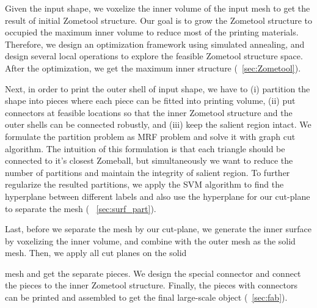 Given the input shape, we voxelize the inner volume of the input mesh to get the result of  initial Zometool structure.
Our goal is to grow the Zometool structure to occupied the maximum inner volume  to reduce most of the printing materials.
Therefore, we design an optimization framework using simulated annealing, and design several local operations to explore the feasible Zometool structure space.
After the optimization, we get the maximum inner structure (\secname~\ref{sec:Zometool}).

Next, in order to print the outer shell of input shape, we have to (i) partition the shape into pieces where each piece can be fitted into printing volume, (ii) put connectors at feasible locations so that the inner Zometool structure and the outer shells can be connected robustly, and (iii) keep the salient region intact.
We formulate the partition problem as  MRF problem and solve it with graph cut algorithm.
The intuition of this formulation is that each triangle should be connected to it's closest Zomeball, but simultaneously we want to reduce the number of partitions and maintain the integrity of salient region.
To further regularize the resulted partitions, we apply the SVM algorithm to find the hyperplane  between different labels and also use the hyperplane for our cut-plane to separate the mesh ( \secname~\ref{sec:surf_part}).

Last, before we separate the mesh by our cut-plane, we generate the inner surface by voxelizing the inner volume, and combine with the outer mesh as the solid mesh. 
Then, we apply all cut planes on the solidmesh and get the separate pieces. 
We design the special connector and connect the pieces to the inner Zometool structure. 
Finally, the pieces with connectors can be printed and assembled to get the final large-scale object (\secname~\ref{sec:fab}).

